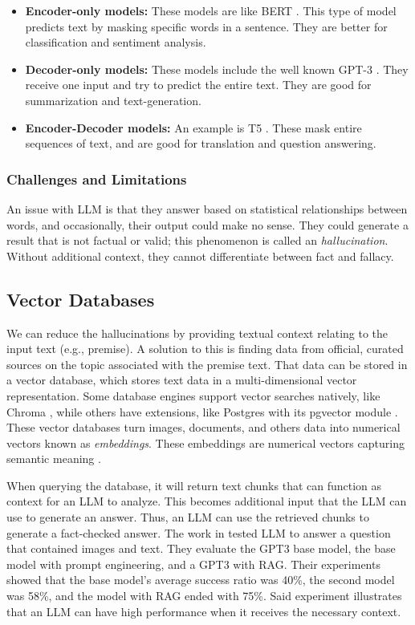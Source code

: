 \begin{itemize}
\item{\textbf{Encoder-only models:}} These models are like BERT \cite{DBLP:journals/corr/abs-1810-04805}. This type of model predicts text by masking specific words in a sentence. They are better for classification and sentiment analysis.
\item{\textbf{Decoder-only models:}} These models include the well known GPT-3 \cite{DBLP:journals/corr/abs-2005-14165}. They receive one input and try to predict the entire text. They are good for summarization and text-generation.
\item{\textbf{Encoder-Decoder models:}} An example is T5 \cite{2020t5}. These mask entire sequences of text, and are good for translation and question  answering.
\end{itemize}

\subsubsection{Challenges and Limitations}
An issue with LLM is that they answer based on statistical relationships between words, and occasionally, their output could make no sense. They could generate a result that is not factual
or valid; this phenomenon is called an {\em hallucination}. Without additional context, they cannot differentiate between fact and fallacy.

\subsection{Vector Databases}
We can reduce the hallucinations by providing textual context relating to the input text (e.g., premise). A solution to this is finding data from official, curated sources  on the topic associated with the premise text. That data can be stored
in a vector database, which stores text data in a multi-dimensional vector representation.  Some database  engines support vector searches natively, like Chroma \cite{chroma}, while others have extensions,
like Postgres with its pgvector module \cite{pgvector}. These vector databases turn images, documents, and others data into numerical vectors known as {\em embeddings}. These embeddings are numerical vectors capturing semantic meaning \cite{10455990}.
 
When querying the database, it will return text chunks that can function as context for an LLM to analyze. This becomes additional input that the LLM can use to generate an answer. Thus, an LLM can use the retrieved chunks to generate a fact-checked answer.
The work in \cite{10683437}  tested LLM to answer a question that contained images and text. They evaluate the GPT3 base model, the base model with prompt engineering,
and a GPT3 with RAG. Their experiments showed that the base model's average success ratio was 40\%, the second model was 58\%, and the model with RAG ended with 75\%. Said experiment illustrates  that
an LLM can have high performance when it receives the necessary context. 

